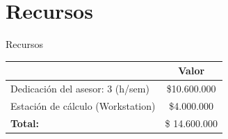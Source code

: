 \documentclass{beamer}
\begin{document}
\section{Recursos}
\begin{frame}{Recursos}
    \begin{table}[!htp]
        \centering
            \begin{tabular}{|l|c|}
                \hline
                & \textbf{Valor} \\\hline
                Dedicación del asesor: 3 (h/sem) & \$10.600.000 \\ \hline
                Estación de cálculo (Workstation) & \$4.000.000 \\ \hline
                \textbf{Total:} & \$ 14.600.000 \\ \hline
            \end{tabular}
    \end{table}
\end{frame}
\end{document}
